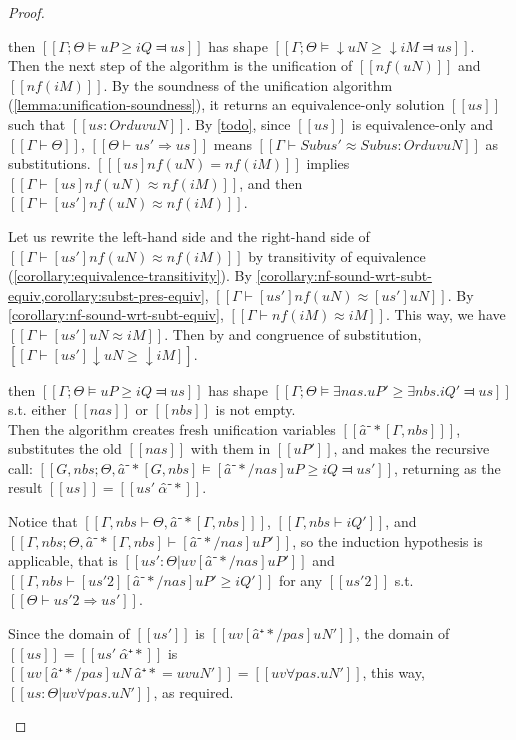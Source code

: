 \begin{proof}
\begin{caseof}
    \item \label{case:pos-subt-soundness:arrow} 
      then
    $[[Γ ; Θ ⊨ uP ≥ iQ ⫤ us]]$ has shape $[[Γ;Θ ⊨ ↓uN ≥ ↓iM ⫤ us]]$.\\
    Then the next step of the algorithm is the unification of $[[nf(uN)]]$ and $[[nf(iM)]]$.
    By the soundness of the unification algorithm (\cref{lemma:unification-soundness}),
    it returns an equivalence-only solution $[[us]]$ such that $[[us : Ord uv uN]]$.
    By \cref{todo}, since $[[us]]$ is equivalence-only and $[[Γ ⊢ Θ]]$, $[[Θ ⊢ us' ⇒ us]]$ means 
    $[[ Γ ⊢ Sub us' ≈ Sub us : Ord uv uN ]]$ as substitutions.
    $[[ [us]nf(uN) = nf(iM) ]]$ implies $[[Γ ⊢ [us]nf(uN) ≈ nf(iM)]]$, and then 
        $[[Γ ⊢ [us']nf(uN) ≈ nf(iM)]]$. 

        Let us rewrite the left-hand side and the right-hand side of $[[Γ ⊢ [us']nf(uN) ≈ nf(iM)]]$ by 
        transitivity of equivalence (\cref{corollary:equivalence-transitivity}).
        By \cref{corollary:nf-sound-wrt-subt-equiv,corollary:subst-pres-equiv},
        $[[Γ ⊢ [us']nf(uN) ≈ [us']uN ]]$. By \cref{corollary:nf-sound-wrt-subt-equiv}, 
        $[[Γ ⊢ nf(iM) ≈ iM ]]$. 
        This way, we have $[[Γ ⊢ [us']uN ≈ iM]]$.
        Then by 
        and congruence of substitution, $[[Γ ⊢ [us']↓uN ≥ ↓iM]]$.
    
    \item \label{case:pos-subt-soundness:exists}
        then
        $[[Γ ; Θ ⊨ uP ≥ iQ ⫤ us]]$ has shape $[[Γ;Θ ⊨ ∃nas.uP' ≥ ∃nbs.iQ' ⫤ us]]$ s.t. either $[[nas]]$ or $[[nbs]]$ is not empty.\\
        Then the algorithm creates fresh unification variables $[[â⁻*[Γ,nbs] ]]$, 
        substitutes the old $[[nas]]$ with them in $[[uP']]$, and makes the recursive call:
        $[[G, nbs; Θ, â⁻*[G, nbs] ⊨ [â⁻*/nas] uP ≥ iQ ⫤ us']]$, returning as the result
        $[[us]] = [[us' \ {α̂⁻*}]]$.

        Notice that $[[Γ, nbs ⊢ Θ, â⁻*[Γ, nbs] ]]$, $[[Γ,nbs ⊢ iQ']]$, and 
        $[[Γ,nbs; Θ, â⁻*[Γ, nbs] ⊢ [â⁻*/nas] uP' ]]$, so the induction hypothesis is applicable,
        that is $[[us' : Θ | uv [â⁻*/nas]uP']]$ and $[[ Γ, nbs ⊢ [us'2][â⁻*/nas]uP' ≥ iQ' ]]$ for any
        $[[us'2]]$ s.t. $[[Θ ⊢ us'2 ⇒ us']]$.

        Since the domain of $[[us']]$ is $[[uv [â⁺*/pas]uN']]$, the domain of 
        $[[us]] = [[us' \  {α̂⁺*}]]$ is $[[uv [â⁺*/pas]uN \ {â⁺*} = uv uN']] = [[uv ∀pas.uN']]$,
        this way, $[[us : Θ | uv ∀pas.uN']]$, as required.


\end{caseof}
\end{proof}
